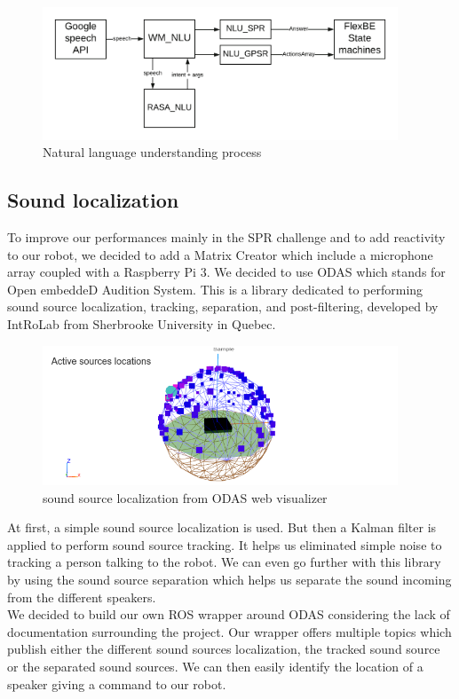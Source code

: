 \documentclass[runningheads,a4paper]{llncs}
\begin{document}
\begin{figure}
  \centering
  \includegraphics[width=300pt]{images/wm_nlu.png}
  \caption{Natural language understanding process}
\end{figure} 

\subsection{Sound localization}
\tab To improve our performances mainly in the SPR challenge and to add reactivity to our robot, we decided to add a Matrix Creator which include a microphone array coupled with a Raspberry Pi 3. We decided to use ODAS  \cite{ODAS} which stands for Open embeddeD Audition System. This is a library dedicated to performing sound source localization, tracking, separation, and post-filtering, developed by IntRoLab\cite{Introlab} from Sherbrooke University in Quebec.\\ 

\begin{figure}
  \centering
  \includegraphics[width=300pt]{images/odas.png}
  \caption{ sound source localization from ODAS web visualizer \cite{ODAS}}
\end{figure} 

At first, a simple sound source localization is used. But then a Kalman filter is applied to perform sound source tracking. It helps us eliminated simple noise to tracking a person talking to the robot. We can even go further with this library by using the sound source separation which helps us separate the sound incoming from the different speakers.\\

We decided to build our own ROS wrapper around ODAS considering the lack of documentation surrounding the project. Our wrapper offers multiple topics which publish either the different sound sources localization, the tracked sound source or the separated sound sources. We can then easily identify the location of a speaker giving a command to our robot.\\
\end{document}
